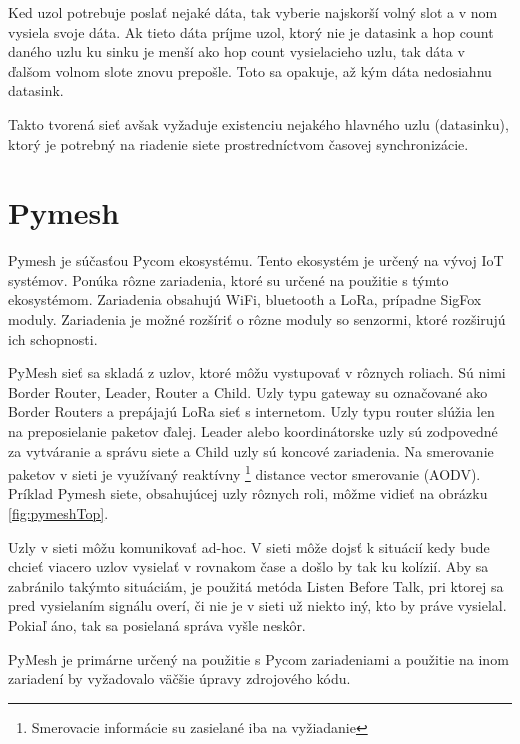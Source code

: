 \documentclass[slovak,master]{diploma}
\begin{document}
Ked uzol potrebuje poslať nejaké dáta, tak vyberie najskorší volný slot a v nom vysiela svoje dáta. Ak tieto dáta príjme uzol, ktorý nie je datasink a 
hop count daného uzlu ku sinku je menší ako hop count vysielacieho uzlu, tak dáta v ďalšom volnom slote znovu prepošle. Toto sa opakuje, až 
kým dáta nedosiahnu datasink.

Takto tvorená sieť avšak vyžaduje existenciu nejakého hlavného uzlu (datasinku), ktorý je potrebný na riadenie siete prostredníctvom časovej synchronizácie.

\section{Pymesh}
Pymesh je súčasťou Pycom \cite{pycom} ekosystému. Tento ekosystém je určený na vývoj IoT systémov. Ponúka rôzne zariadenia, ktoré su určené na použitie s týmto 
ekosystémom. Zariadenia obsahujú WiFi, bluetooth a LoRa, prípadne SigFox moduly. Zariadenia je možné rozšíriť o rôzne moduly so senzormi, ktoré rozširujú ich schopnosti.

PyMesh sieť sa skladá z uzlov, ktoré môžu vystupovať v rôznych roliach. Sú nimi Border Router, Leader, Router a Child. Uzly typu gateway su označované ako Border Routers a prepájajú LoRa sieť s 
internetom. Uzly typu router slúžia len na preposielanie paketov ďalej. Leader alebo koordinátorske uzly sú zodpovedné za vytváranie a správu siete a Child uzly sú koncové 
zariadenia. Na smerovanie paketov v sieti je využívaný reaktívny \footnote[1]{Smerovacie informácie su zasielané iba na vyžiadanie} distance vector smerovanie (AODV). 
Príklad Pymesh siete, obsahujúcej uzly rôznych roli, môžme vidieť na obrázku \ref{fig:pymeshTop}.

Uzly v sieti môžu komunikovať ad-hoc. V sieti môže dojsť k situácií kedy bude chcieť viacero uzlov vysielať v rovnakom čase a došlo by tak ku kolízií.
Aby sa zabránilo takýmto situáciám, je použitá metóda Listen Before Talk, pri ktorej sa pred vysielaním signálu overí, či nie je v sieti už niekto iný, kto by práve 
vysielal. Pokiaľ áno, tak sa posielaná správa vyšle neskôr.

PyMesh je primárne určený na použitie s Pycom zariadeniami a použitie na inom zariadení by vyžadovalo väčšie úpravy zdrojového kódu.
\end{document}
